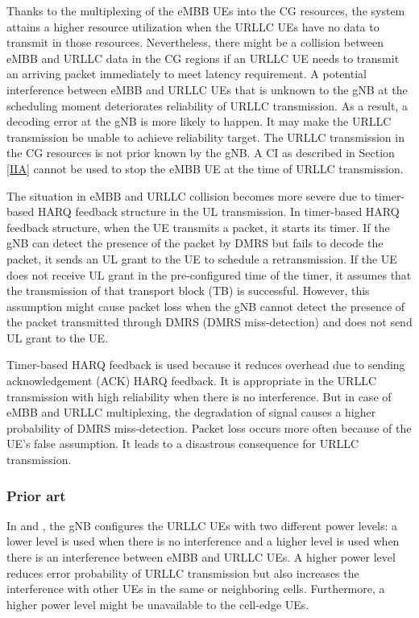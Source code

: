 \documentclass{ieeeaccess}
\begin{document}
Thanks to the multiplexing of the eMBB UEs into the CG resources, the system attains a higher resource utilization when the URLLC UEs have no data to transmit in those resources. Nevertheless, there might be a collision between eMBB and URLLC data in the CG regions if an URLLC UE needs to transmit an arriving packet immediately to meet latency requirement. A potential interference between eMBB and URLLC UEs that is unknown to the gNB at the scheduling moment deteriorates reliability of URLLC transmission. As a result, a decoding error at the gNB is more likely to happen. It may make the URLLC transmission be unable to achieve reliability target. The URLLC transmission in the CG resources is not prior known by the gNB. A CI as described in Section \ref{IIA} cannot be used to stop the eMBB UE at the time of URLLC transmission.

The situation in eMBB and URLLC collision becomes more severe due to timer-based HARQ feedback structure in the UL transmission. In timer-based HARQ feedback structure, when the UE transmits a packet, it starts its timer. If the gNB can detect the presence of the packet by DMRS but fails to decode the packet, it sends an UL grant to the UE to schedule a retransmission. If the UE does not receive UL grant in the pre-configured time of the timer, it assumes that the transmission of that transport block (TB) is successful. However, this assumption might cause packet loss when the gNB cannot detect the presence of the packet transmitted through DMRS (DMRS miss-detection) and does not send UL grant to the UE. 

Timer-based HARQ feedback is used because it reduces overhead due to sending acknowledgement (ACK) HARQ feedback. It is appropriate in the URLLC transmission with high reliability when there is no interference. But in case of eMBB and URLLC multiplexing, the degradation of signal causes a higher probability of DMRS miss-detection. Packet loss occurs more often because of the UE's false assumption. It leads to a disastrous consequence for URLLC transmission.

\subsubsection{Prior art} \label{IIBN}

In \cite{ref13} and \cite {ref14}, the gNB configures the URLLC UEs with two different power levels: a lower level is used when there is no interference and a higher level is used when there is an interference between eMBB and URLLC UEs. A higher power level reduces error probability of URLLC transmission but also increases the interference with other UEs in the same or neighboring cells. Furthermore, a higher power level might be unavailable to the cell-edge UEs.
\end{document}
